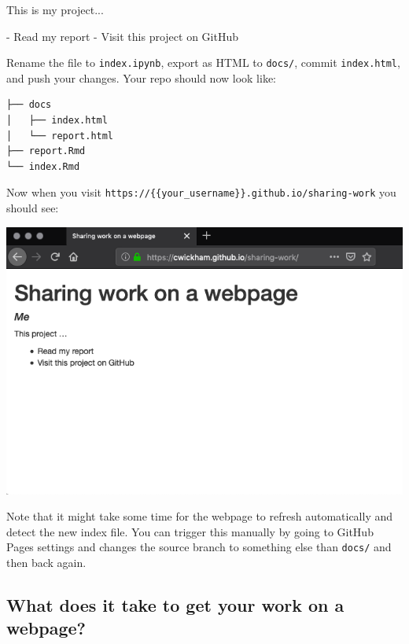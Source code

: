 \documentclass[]{Nemilov}
\newenvironment{Shaded}{\begin{snugshade}}{\end{snugshade}}
\newcommand{\FloatTok}[1]{\textcolor[rgb]{0.00,0.00,0.81}{#1}}
\newcommand{\NormalTok}[1]{#1}
\begin{document}
\begin{Shaded}
\begin{Highlighting}[]
\NormalTok{This is my project...}

\NormalTok{- }\FloatTok{Read my report}
\FloatTok{- Visit this project on GitHub}
\end{Highlighting}
\end{Shaded}

Rename the file to \texttt{index.ipynb},
export as HTML to \texttt{docs/},
commit \texttt{index.html},
and push your changes.
Your repo should now look like:

\begin{verbatim}
├── docs
│   ├── index.html
│   └── report.html
├── report.Rmd
└── index.Rmd
\end{verbatim}

Now when you visit \texttt{https://\{\{your\_username\}\}.github.io/sharing-work} you should see:

\includegraphics{figures/r-publishing/index.png}

Note that it might take some time for the webpage to refresh automatically
and detect the new index file.
You can trigger this manually by going to GitHub Pages settings
and changes the source branch to something else than \texttt{docs/} and then back again.

\hypertarget{what-does-it-take-to-get-your-work-on-a-webpage}{%
\subsection{What does it take to get your work on a webpage?}\label{what-does-it-take-to-get-your-work-on-a-webpage}}
\end{document}
